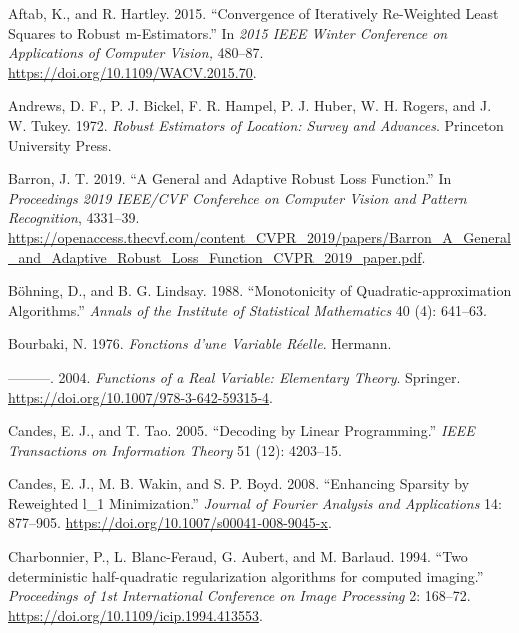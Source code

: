 \documentclass[
  12pt,
  letterpaper,
  DIV=11,
  numbers=noendperiod]{scrartcl}
\newlength{\cslhangindent}
\newenvironment{CSLReferences}[2] %
 {\begin{list}{}{%
  \setlength{\itemindent}{0pt}
  \setlength{\leftmargin}{0pt}
  \setlength{\parsep}{0pt}
  \ifodd #1
   \setlength{\leftmargin}{\cslhangindent}
   \setlength{\itemindent}{-1\cslhangindent}
  \fi
  \setlength{\itemsep}{#2\baselineskip}}}
 {\end{list}}
\theoremstyle{plain}
\theoremstyle{plain}
\theoremstyle{plain}
\theoremstyle{definition}
\theoremstyle{remark}
\begin{document}
\label{refs}
\begin{CSLReferences}{1}{0}
Aftab, K., and R. Hartley. 2015. {``Convergence of Iteratively
Re-Weighted Least Squares to Robust m-Estimators.''} In \emph{2015 IEEE
Winter Conference on Applications of Computer Vision,} 480--87.
\url{https://doi.org/10.1109/WACV.2015.70}.

Andrews, D. F., P. J. Bickel, F. R. Hampel, P. J. Huber, W. H. Rogers,
and J. W. Tukey. 1972. \emph{Robust Estimators of Location: Survey and
Advances}. Princeton University Press.

Barron, J. T. 2019. {``A General and Adaptive Robust Loss Function.''}
In \emph{Proceedings 2019 IEEE/CVF Conferehce on Computer Vision and
Pattern Recognition}, 4331--39.
\url{https://openaccess.thecvf.com/content_CVPR_2019/papers/Barron_A_General_and_Adaptive_Robust_Loss_Function_CVPR_2019_paper.pdf}.

Böhning, D., and B. G. Lindsay. 1988. {``{Monotonicity of
Quadratic-approximation Algorithms}.''} \emph{Annals of the Institute of
Statistical Mathematics} 40 (4): 641--63.

Bourbaki, N. 1976. \emph{{Fonctions d'une Variable R{é}elle}}. Hermann.

---------. 2004. \emph{Functions of a Real Variable: Elementary Theory}.
Springer. \url{https://doi.org/10.1007/978-3-642-59315-4}.

Candes, E. J., and T. Tao. 2005. {``Decoding by Linear Programming.''}
\emph{IEEE Transactions on Information Theory} 51 (12): 4203--15.

Candes, E. J., M. B. Wakin, and S. P. Boyd. 2008. {``Enhancing Sparsity
by Reweighted l\_1 Minimization.''} \emph{Journal of Fourier Analysis
and Applications} 14: 877--905.
\url{https://doi.org/10.1007/s00041-008-9045-x}.

Charbonnier, P., L. Blanc-Feraud, G. Aubert, and M. Barlaud. 1994.
{``{Two deterministic half-quadratic regularization algorithms for
computed imaging}.''} \emph{Proceedings of 1st International Conference
on Image Processing} 2: 168--72.
\url{https://doi.org/10.1109/icip.1994.413553}.


\end{CSLReferences}
\end{document}
